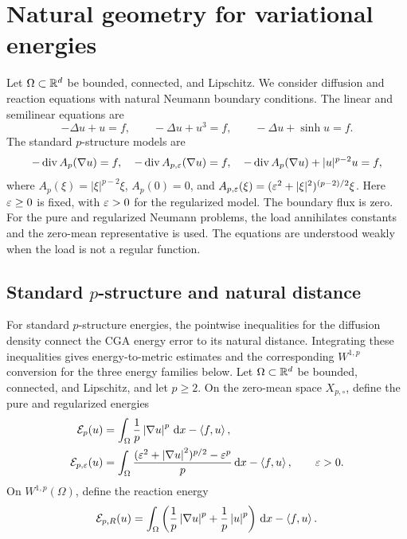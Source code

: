 \section{Natural geometry for variational energies}
\label{sec:pgeometry}

Let \(\Omega\subset\mathbb{R}^d\) be bounded, connected, and Lipschitz.
We consider diffusion and reaction equations with natural Neumann boundary conditions.
The linear and semilinear equations are
\[
-\Delta u+u=f,\qquad -\Delta u+u^3=f,\qquad -\Delta u+\sinh u=f.
\]
The standard \(p\)-structure models are
\[
-\operatorname{div}A_p(\nabla u)=f,\quad
-\operatorname{div}A_{p,\varepsilon}(\nabla u)=f,\quad
-\operatorname{div}A_p(\nabla u)+|u|^{p-2}u=f,
\]
where \(A_p(\xi)=|\xi|^{p-2}\xi\), \(A_p(0)=0\), and
\(A_{p,\varepsilon}(\xi)=(\varepsilon^2+|\xi|^2)^{(p-2)/2}\xi\).
Here \(\varepsilon\geq0\) is fixed, with \(\varepsilon>0\) for the regularized model.
The boundary flux is zero. For the pure and regularized Neumann problems, the load annihilates constants and the zero-mean representative is used.
The equations are understood weakly when the load is not a regular function.



\subsection{Standard \texorpdfstring{\(p\)}{p}-structure and natural distance}

For standard \(p\)-structure energies, the pointwise inequalities for the diffusion density connect the CGA energy error to its natural distance. Integrating these inequalities gives energy-to-metric estimates and the corresponding \(W^{1,p}\) conversion for the three energy families below. Let \(\Omega\subset\mathbb{R}^d\) be bounded, connected, and Lipschitz, and let \(p\geq2\). On the zero-mean space \(X_{p,\circ}\), define the pure and regularized energies
\begin{align}
 \mathcal{E}_p(u)&=\int_\Omega\frac1p\left|\nabla u\right|^p\,\mathrm{d} x-\left\langle f,u\right\rangle,
 \label{eq:pure-energy}\\
 \mathcal{E}_{p,\varepsilon}(u)&=\int_\Omega
 \frac{(\varepsilon^2+\left|\nabla u\right|^2)^{p/2}-\varepsilon^p}{p}\,\mathrm{d} x-\left\langle f,u\right\rangle,
 \qquad\varepsilon>0.
 \label{eq:reg-energy}
\end{align}
On \(W^{1,p}(\Omega)\), define the reaction energy
\begin{equation}
 \mathcal{E}_{p,R}(u)=\int_\Omega\left(\frac1p\left|\nabla u\right|^p+
 \frac1p\left|u\right|^p\right)\,\mathrm{d} x-\left\langle f,u\right\rangle.
 \label{eq:reaction-energy}
\end{equation}

